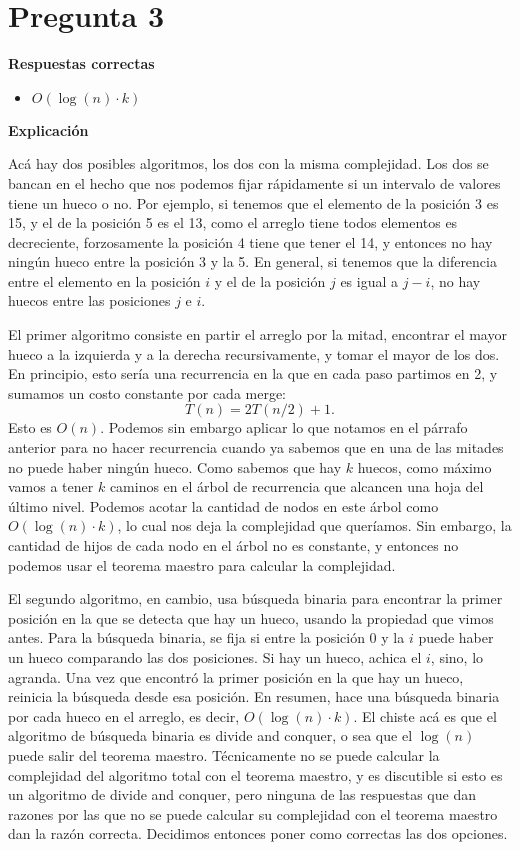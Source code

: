 \documentclass{article}
\begin{document}
\section*{Pregunta 3}
\textbf{Respuestas correctas}

\begin{itemize}
    \item $O(\log(n)\cdot k)$
\end{itemize}

\textbf{Explicación}

Acá hay dos posibles algoritmos, los dos con la misma complejidad. Los dos se bancan en el hecho que nos podemos fijar rápidamente si un intervalo de valores tiene un hueco o no. Por ejemplo, si tenemos que el elemento de la posición 3 es 15, y el de la posición 5 es el 13, como el arreglo tiene todos elementos es decreciente, forzosamente la posición 4 tiene que tener el 14, y entonces no hay ningún hueco entre la posición 3 y la 5. En general, si tenemos que la diferencia entre el elemento en la posición $i$ y el de la posición $j$ es igual a $j - i$, no hay huecos entre las posiciones $j$ e $i$.

El primer algoritmo consiste en partir el arreglo por la mitad, encontrar el mayor hueco a la izquierda y a la derecha recursivamente, y tomar el mayor de los dos. En principio, esto sería una recurrencia en la que en cada paso partimos en 2, y sumamos un costo constante por cada merge: 
\[
T(n) = 2T(n/2) + 1.
\]
Esto es $O(n)$. Podemos sin embargo aplicar lo que notamos en el párrafo anterior para no hacer recurrencia cuando ya sabemos que en una de las mitades no puede haber ningún hueco. Como sabemos que hay $k$ huecos, como máximo vamos a tener $k$ caminos en el árbol de recurrencia que alcancen una hoja del último nivel. Podemos acotar la cantidad de nodos en este árbol como $O(\log(n)\cdot k)$, lo cual nos deja la complejidad que queríamos. Sin embargo, la cantidad de hijos de cada nodo en el árbol no es constante, y entonces no podemos usar el teorema maestro para calcular la complejidad.

El segundo algoritmo, en cambio, usa búsqueda binaria para encontrar la primer posición en la que se detecta que hay un hueco, usando la propiedad que vimos antes. Para la búsqueda binaria, se fija si entre la posición 0 y la $i$ puede haber un hueco comparando las dos posiciones. Si hay un hueco, achica el $i$, sino, lo agranda. Una vez que encontró la primer posición en la que hay un hueco, reinicia la búsqueda desde esa posición. En resumen, hace una búsqueda binaria por cada hueco en el arreglo, es decir, $O(\log(n)\cdot k)$. El chiste acá es que el algoritmo de búsqueda binaria es divide and conquer, o sea que el $\log(n)$ puede salir del teorema maestro. Técnicamente no se puede calcular la complejidad del algoritmo total con el teorema maestro, y es discutible si esto es un algoritmo de divide and conquer, pero ninguna de las respuestas que dan razones por las que no se puede calcular su complejidad con el teorema maestro dan la razón correcta. Decidimos entonces poner como correctas las dos opciones.
\end{document}
